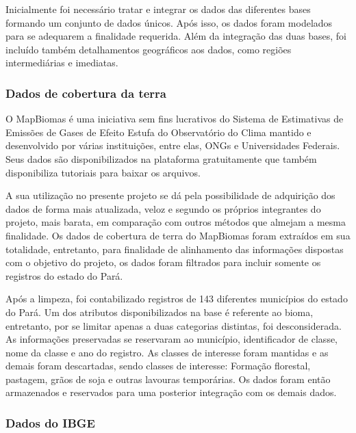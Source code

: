 Inicialmente foi necessário tratar e integrar os dados das diferentes bases formando um conjunto de dados únicos. Após isso, os dados foram modelados para se adequarem a finalidade requerida. Além da integração das duas bases, foi incluído também detalhamentos geográficos aos dados, como regiões intermediárias e imediatas.




\subsubsection{Dados de cobertura da terra}

O MapBiomas é uma iniciativa sem fins lucrativos do Sistema de Estimativas de Emissões de Gases de Efeito Estufa do Observatório do Clima mantido e desenvolvido por várias instituições, entre elas, ONGs e Universidades Federais. Seus dados são disponibilizados na plataforma gratuitamente que também disponibiliza tutoriais para baixar os arquivos. 

A sua utilização no presente projeto se dá pela possibilidade de adquirição dos dados de forma mais atualizada, veloz e segundo os próprios integrantes do projeto, mais barata, em comparação com outros métodos que almejam a mesma finalidade. Os dados de cobertura de terra do MapBiomas foram extraídos em sua totalidade, entretanto, para finalidade de alinhamento das informações dispostas com o objetivo do projeto, os dados foram filtrados para incluir somente os registros do estado do Pará. 

Após a limpeza, foi contabilizado registros de 143 diferentes municípios do estado do Pará. Um dos atributos disponibilizados na base é referente ao bioma, entretanto, por se limitar apenas a duas categorias distintas, foi desconsiderada. As informações preservadas se reservaram ao município, identificador de classe, nome da classe e ano do registro. As classes de interesse foram mantidas e as demais foram descartadas, sendo classes de interesse: Formação florestal, pastagem, grãos de soja e outras lavouras temporárias. Os dados foram então armazenados e reservados para uma posterior integração com os demais dados.

\subsubsection{Dados do IBGE}


